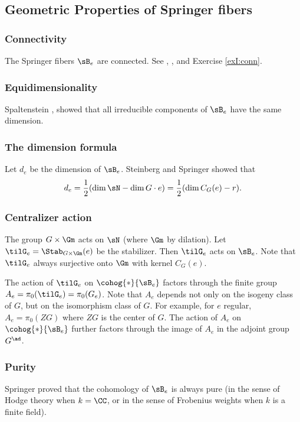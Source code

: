 \subsection{Geometric Properties of Springer fibers}

\subsubsection{Connectivity} The Springer fibers $\sB_{e}$ are connected. See \cite[p.131, Prop 1]{StConj}, \cite[Ch II, Cor 1.7]{Spaltenstein}, and Exercise \ref{exI:conn}.

\subsubsection{Equidimensionality} Spaltenstein \cite{Spa77}, \cite[Ch II, Prop 1.12]{Spaltenstein} showed that all  irreducible components of $\sB_{e}$ have the same dimension. 

\subsubsection{The dimension formula} Let $d_{e}$ be the dimension of $\sB_{e}$. Steinberg \cite[Thm 4.6]{St} and Springer \cite{Springer} showed that
\begin{equation}\label{Spr dim}
d_{e}=\frac{1}{2}(\dim\sN-\dim G\cdot e)=\frac{1}{2}(\dim C_{G}(e)-r).
\end{equation}


\subsubsection{Centralizer action} The group $G\times \Gm$ acts on $\sN$ (where $\Gm$ by dilation). Let $\tilG_{e}=\Stab_{G\times \Gm}(e)$ be the stabilizer. Then $\tilG_{e}$ acts on $\sB_{e}$. Note that $\tilG_{e}$ always surjective onto $\Gm$ with kernel $C_{G}(e)$.

The action of $\tilG_{e}$ on $\cohog{*}{\sB_{e}}$ factors through the finite group $A_{e}=\pi_{0}(\tilG_{e})=\pi_{0}(G_{e})$. Note that $A_{e}$ depends not only on the isogeny class of $G$, but on the isomorphism class of $G$. For example, for $e$ regular, $A_{e}=\pi_{0}(ZG)$ where $ZG$ is the center of $G$. The action of $A_{e}$ on $\cohog{*}{\sB_{e}}$ further factors through the image of $A_{e}$ in the adjoint group $G^{\ad}$.


\subsubsection{Purity} Springer \cite{SpringerPure} proved that the cohomology of $\sB_{e}$ is always pure (in the sense of Hodge theory when $k=\CC$, or in the sense of Frobenius weights when $k$ is a finite field). 


